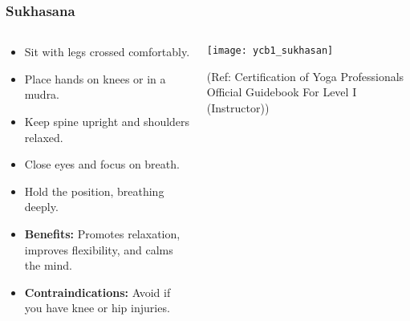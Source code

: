 \begin{frame}[fragile]\frametitle{Sukhasana}
\begin{columns}
    \begin{column}[T]{0.5\linewidth}
      \begin{itemize}
        \item Sit with legs crossed comfortably.
        \item Place hands on knees or in a mudra.
        \item Keep spine upright and shoulders relaxed.
        \item Close eyes and focus on breath.
        \item Hold the position, breathing deeply.
        \item \textbf{Benefits:} Promotes relaxation, improves flexibility, and calms the mind.
        \item \textbf{Contraindications:} Avoid if you have knee or hip injuries.
      \end{itemize}
    \end{column}
    \begin{column}[T]{0.5\linewidth}
        \begin{center}
        \begin{center}
		        \texttt{[image: ycb1\_sukhasan]}
				
				{\tiny (Ref: Certification  of Yoga Professionals Official Guidebook For Level I (Instructor))}	        
		\end{center}   
        \end{center}    
    \end{column}
  \end{columns}
\end{frame}

